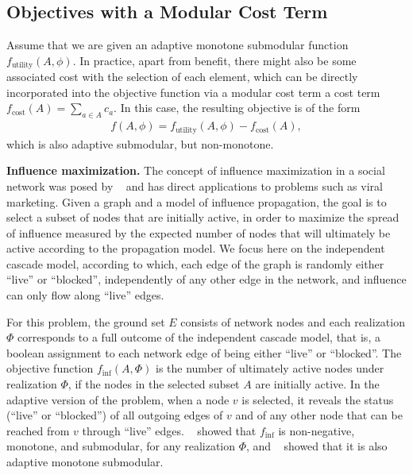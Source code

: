 \documentclass{article}
\newcommand{\citet}[1]{\citeauthor{#1}~\shortcite{#1}}
\renewcommand{\paragraph}[1]{\vspace{0.3em}\noindent\textbf{#1.}\makebox[0.5em]{}}
\begin{document}
\subsection{Objectives with a Modular Cost Term}
Assume that we are given an adaptive monotone submodular function $f_{\textrm{utility}}(A, \phi)$.
In practice, apart from benefit, there might also be some associated cost with the selection of each element, which can be directly incorporated into the objective function via a modular cost term a cost term $f_{\textrm{cost}}(A) = \sum_{a \in A} c_a$.
In this case, the resulting objective is of the form
\begin{align} \label{eq:cost}
  f(A, \phi) = f_{\textrm{utility}}(A, \phi) - f_{\textrm{cost}}(A),
\end{align}
which is also adaptive submodular, but non-monotone.

\paragraph{Influence maximization}
The concept of influence maximization in a social network was posed by \citet{kempe03} and has direct applications to problems such as viral marketing.
Given a graph and a model of influence propagation, the goal is to select a subset of nodes that are initially active, in order to maximize the spread of influence measured by the expected number of nodes that will ultimately be active according to the propagation model.
We focus here on the independent cascade model, according to which, each edge of the graph is randomly either ``live'' or ``blocked'', independently of any other edge in the network, and influence can only flow along ``live'' edges.

For this problem, the ground set $E$ consists of network nodes and each realization $\Phi$ corresponds to a full outcome of the independent cascade model, that is, a boolean assignment to each network edge of being either ``live'' or ``blocked''.
The objective function $f_{\textrm{inf}}(A, \Phi)$ is the number of ultimately active nodes under realization $\Phi$, if the nodes in the selected subset $A$ are initially active.
In the adaptive version of the problem, when a node $v$ is selected, it reveals the status (``live'' or ``blocked'') of all outgoing edges of $v$ and of any other node that can be reached from $v$ through ``live'' edges.
\citet{kempe03} showed that $f_{\textrm{inf}}$ is non-negative, monotone, and submodular, for any realization $\Phi$, and \citet{golovin11} showed that it is also adaptive monotone submodular.
\end{document}

